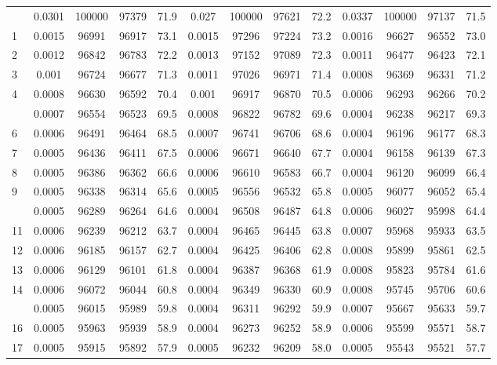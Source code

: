 \documentclass[
  14pt,
]{article}
\begin{document}
\begin{longtable}[t]{lcccccccccccc}
\endfoot
\bottomrule
\endlastfoot
0 & 0.0301 & 100000 & 97379 & 71.9 & 0.027 & 100000 & 97621 & 72.2 & 0.0337 & 100000 & 97137 & 71.5\\
1 & 0.0015 & 96991 & 96917 & 73.1 & 0.0015 & 97296 & 97224 & 73.2 & 0.0016 & 96627 & 96552 & 73.0\\
2 & 0.0012 & 96842 & 96783 & 72.2 & 0.0013 & 97152 & 97089 & 72.3 & 0.0011 & 96477 & 96423 & 72.1\\
3 & 0.001 & 96724 & 96677 & 71.3 & 0.0011 & 97026 & 96971 & 71.4 & 0.0008 & 96369 & 96331 & 71.2\\
4 & 0.0008 & 96630 & 96592 & 70.4 & 0.001 & 96917 & 96870 & 70.5 & 0.0006 & 96293 & 96266 & 70.2\\
\addlinespace
5 & 0.0007 & 96554 & 96523 & 69.5 & 0.0008 & 96822 & 96782 & 69.6 & 0.0004 & 96238 & 96217 & 69.3\\
6 & 0.0006 & 96491 & 96464 & 68.5 & 0.0007 & 96741 & 96706 & 68.6 & 0.0004 & 96196 & 96177 & 68.3\\
7 & 0.0005 & 96436 & 96411 & 67.5 & 0.0006 & 96671 & 96640 & 67.7 & 0.0004 & 96158 & 96139 & 67.3\\
8 & 0.0005 & 96386 & 96362 & 66.6 & 0.0006 & 96610 & 96583 & 66.7 & 0.0004 & 96120 & 96099 & 66.4\\
9 & 0.0005 & 96338 & 96314 & 65.6 & 0.0005 & 96556 & 96532 & 65.8 & 0.0005 & 96077 & 96052 & 65.4\\
\addlinespace
10 & 0.0005 & 96289 & 96264 & 64.6 & 0.0004 & 96508 & 96487 & 64.8 & 0.0006 & 96027 & 95998 & 64.4\\
11 & 0.0006 & 96239 & 96212 & 63.7 & 0.0004 & 96465 & 96445 & 63.8 & 0.0007 & 95968 & 95933 & 63.5\\
12 & 0.0006 & 96185 & 96157 & 62.7 & 0.0004 & 96425 & 96406 & 62.8 & 0.0008 & 95899 & 95861 & 62.5\\
13 & 0.0006 & 96129 & 96101 & 61.8 & 0.0004 & 96387 & 96368 & 61.9 & 0.0008 & 95823 & 95784 & 61.6\\
14 & 0.0006 & 96072 & 96044 & 60.8 & 0.0004 & 96349 & 96330 & 60.9 & 0.0008 & 95745 & 95706 & 60.6\\
\addlinespace
15 & 0.0005 & 96015 & 95989 & 59.8 & 0.0004 & 96311 & 96292 & 59.9 & 0.0007 & 95667 & 95633 & 59.7\\
16 & 0.0005 & 95963 & 95939 & 58.9 & 0.0004 & 96273 & 96252 & 58.9 & 0.0006 & 95599 & 95571 & 58.7\\
17 & 0.0005 & 95915 & 95892 & 57.9 & 0.0005 & 96232 & 96209 & 58.0 & 0.0005 & 95543 & 95521 & 57.7\\

\end{longtable}
\end{document}
